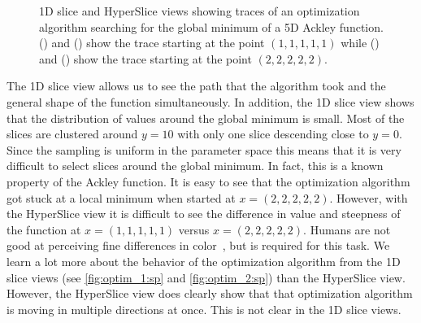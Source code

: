 \begin{figure}
\begin{subfigure}[b]{0.35\linewidth}
    \subcaption{
      \label{fig:optim_2:hs}
    }
  \end{subfigure}
  \caption[1D slice and HyperSlice views of optimization algorithm traces]{%
    1D slice and HyperSlice views showing
    traces of an optimization algorithm searching for the global minimum
    of a 5D Ackley function.
    () and 
    () show the trace starting at the point
    $(1,1,1,1,1)$ while 
    () and 
    () 
    show the trace starting at the point $(2,2,2,2,2)$. 
  }
  \label{fig:optim_trace}
\end{figure}

The 1D slice view allows us to see the path that the algorithm took and the
general shape of the function simultaneously.  In addition, the 1D slice view
shows that the distribution of values around the global minimum is small. Most
of the slices are clustered around \(y=10\) with only one slice descending
close to \(y=0\). Since the sampling is uniform in the parameter space this
means that it is very difficult to select slices around the global minimum. In
fact, this is a known property of the Ackley function.  It is easy to see that
the optimization algorithm got stuck at a local minimum when started at
\(x=(2,2,2,2,2)\). However, with the HyperSlice view it is difficult to see the
difference in value and steepness of the function at \(x=(1,1,1,1,1)\) versus
\(x=(2,2,2,2,2)\).  Humans are not good at perceiving fine differences in
color~\cite{Munzner:2014}, but is required for this task. We learn a lot more
about the behavior of the optimization algorithm from the 1D slice views (see
\autoref{fig:optim_1:sp} and \autoref{fig:optim_2:sp}) than the HyperSlice
view. However, the HyperSlice view does clearly show that that optimization
algorithm is moving in multiple directions at once. This is not clear in the 1D
slice views.


